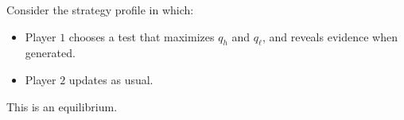 \documentclass[
    preview, 
    varwidth=8.5cm, 
    border={0pt 1pt 1pt 1pt}
    ]{standalone} %
\begin{document}




    Consider the strategy profile in which:
    \begin{itemize}
        \item Player \(1\) chooses a test that maximizes \(q_h\) and \(q_\ell\), 
                and reveals evidence when generated.
        \item Player \(2\) updates as usual.
    \end{itemize}
    

    \vspace{0.2cm}
    This is an equilibrium.
\end{document}
